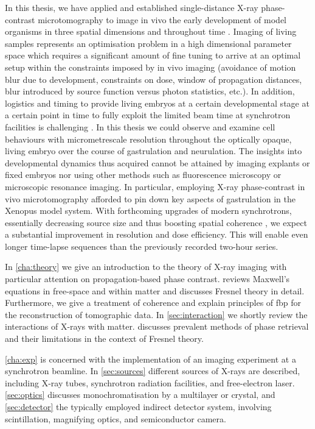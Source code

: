 \documentclass[
twoside,
openright,
titlepage,
numbers=noenddot,
headinclude,
fleqn,
a4paper,
footinclude=true,
cleardoublepage=empty,
abstractoff,
BCOR=5mm,
paper=a4,
fontsize=11pt,
british,ngerman,american,
]{scrreprt}
\begin{document}
In this thesis, we have applied and established single-distance X-ray
phase-contrast microtomography to image in vivo the early development
of model organisms in three spatial dimensions and throughout time
\cite{Moosmann2013nature}.  Imaging of living samples represents an
optimisation problem in a high dimensional parameter space which
requires a significant amount of fine tuning to arrive at an optimal
setup within the constraints imposed by in vivo imaging (avoidance of
motion blur due to development, constraints on dose, window of
propagation distances, blur introduced by source function versus
photon statistics, etc.).  In addition, logistics and timing to
provide living embryos at a certain developmental stage at a certain
point in time to fully exploit the limited beam time at synchrotron
facilities is challenging \cite{Moosmann2014natp}.  In this thesis we
could observe and examine cell behaviours with micrometre\hyph scale
resolution throughout the optically opaque, living embryo over the
course of gastrulation and neurulation.  The insights into
developmental dynamics thus acquired cannot be attained by imaging
explants or fixed embryos nor using other methods such as fluorescence
microscopy or microscopic resonance imaging.  In particular, employing
X-ray phase-contrast in vivo microtomography afforded to pin down key
aspects of gastrulation in the Xenopus model system.  With forthcoming
upgrades of modern synchrotrons, essentially decreasing source size
and thus boosting spatial coherence \cite{Reich2013}, we expect a
substantial improvement in resolution and dose efficiency.  This will
enable even longer time-lapse sequences than the previously recorded
two-hour series.

In \cref{cha:theory} we give an introduction to the theory of X-ray
imaging with particular attention on propagation-based phase contrast.
 reviews Maxwell's equations in free-space
and within matter and discusses Fresnel theory in detail.
Furthermore, we give a treatment of coherence and explain principles
of \ac{fbp} for the reconstruction of tomographic data.  In
\cref{sec:interaction} we shortly review the interactions of X-rays
with matter.   discusses prevalent methods
of phase retrieval and their limitations in the context of Fresnel
theory.

\cref{cha:exp} is concerned with the implementation of an imaging
experiment at a synchrotron beamline.  In \cref{sec:sources} different
sources of X-rays are described, including X-ray tubes, synchrotron
radiation facilities, and free-electron laser.  \cref{sec:optics}
discusses monochromatisation by a multilayer or crystal, and
\cref{sec:detector} the typically employed indirect detector system,
involving scintillation, magnifying optics, and semiconductor camera.
\end{document}

